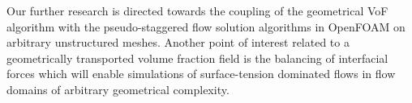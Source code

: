 Our further research is directed towards the coupling of the geometrical VoF
algorithm with the pseudo-staggered flow solution algorithms in OpenFOAM on
arbitrary unstructured meshes. Another point of interest related to a
geometrically transported volume fraction field is the balancing of 
interfacial forces which will enable simulations of surface-tension
dominated flows in flow domains of arbitrary geometrical complexity. 
